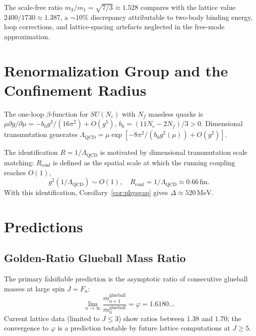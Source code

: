 \documentclass[
  aps,
  prd,
  reprint,
  superscriptaddress,
  nofootinbib,
  longbibliography,
  amsmath,
  amssymb
]{revtex4-2}
\theoremstyle{plain}
\theoremstyle{definition}
\theoremstyle{remark}
\newcommand{\vp}{\varphi}
\newcommand{\Lqcd}{\Lambda_{\mathrm{QCD}}}
\newcommand{\SU}[1]{SU(#1)}
\begin{document}
The scale-free ratio $m_3/m_1=\sqrt{7/3}\approx1.528$ compares with
the lattice value $2400/1730\approx1.387$, a $\sim10\%$ discrepancy
attributable to two-body binding energy, loop corrections, and
lattice-spacing artefacts neglected in the free-mode approximation.

\section{Renormalization Group and the Confinement Radius}
\label{sec:rg}

The one-loop $\beta$-function for $\SU{N_c}$ with $N_f$ massless quarks
is $\mu\partial g/\partial\mu = -b_0 g^3/(16\pi^2)+O(g^5)$,
$b_0=(11N_c-2N_f)/3>0$. Dimensional transmutation generates
$\Lqcd = \mu\exp[-8\pi^2/(b_0 g^2(\mu))+O(g^2)]$.

The identification $R=1/\Lqcd$ is motivated by dimensional
transmutation scale matching: $R_{\mathrm{conf}}$ is defined as
the spatial scale at which the running coupling reaches $O(1)$,
\begin{equation}
  g^2(1/\Lqcd)\sim O(1),\quad R_{\mathrm{conf}}=1/\Lqcd\approx0.66\,\mathrm{fm}.
  \label{eq:confinement}
\end{equation}
With this identification, Corollary~\ref{cor:physgap} gives
$\Delta\approx520\,\mathrm{MeV}$.

\section{Predictions}
\label{sec:predictions}

\subsection{Golden-Ratio Glueball Mass Ratio}

The primary falsifiable prediction is the asymptotic ratio of
consecutive glueball masses at large spin $J=F_n$:
\begin{equation}
  \lim_{n\to\infty}
    \frac{m_{n+1}^{\mathrm{glueball}}}{m_n^{\mathrm{glueball}}}
    = \vp = 1.6180\ldots
  \label{eq:predict}
\end{equation}
Current lattice data (limited to $J\leq3$) show ratios between
$1.38$ and $1.70$; the convergence to $\vp$ is a prediction
testable by future lattice computations at $J\geq5$.
\end{document}
